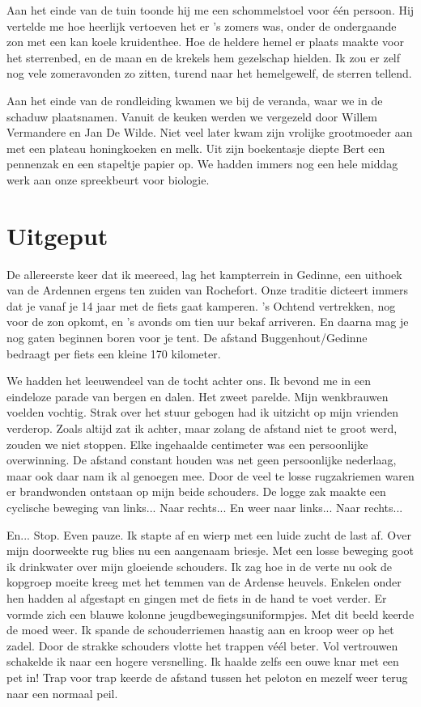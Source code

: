 \documentclass[12pt, justified, a4paper, symmetric]{tufte-book}
\begin{document}
Aan het einde van de tuin toonde hij me een schommelstoel voor \'e\'en persoon. Hij vertelde me hoe heerlijk vertoeven het er 's zomers was, onder de ondergaande zon met een kan koele kruidenthee. Hoe de heldere hemel er plaats maakte voor het sterrenbed, en de maan en de krekels hem gezelschap hielden. Ik zou er zelf nog vele zomeravonden zo zitten, turend naar het hemelgewelf, de sterren tellend.

Aan het einde van de rondleiding kwamen we bij de veranda, waar we in de schaduw plaatsnamen. Vanuit de keuken werden we vergezeld door Willem Vermandere en Jan De Wilde. Niet veel later kwam zijn vrolijke grootmoeder aan met een plateau honingkoeken en melk. Uit zijn boekentasje diepte Bert een pennenzak en een stapeltje papier op. We hadden immers nog een hele middag werk aan onze spreekbeurt voor biologie.

\newpage
\section{Uitgeput}
De allereerste keer dat ik meereed, lag het kampterrein in Gedinne, een uithoek van de Ardennen ergens ten zuiden van Rochefort. Onze traditie dicteert immers dat je vanaf je 14 jaar met de fiets gaat kamperen. 's Ochtend vertrekken, nog voor de zon opkomt, en 's avonds om tien uur bekaf arriveren. En daarna mag je nog gaten beginnen boren voor je tent. De afstand Buggenhout/Gedinne bedraagt per fiets een kleine 170 kilometer.

We hadden het leeuwendeel van de tocht achter ons. Ik bevond me in een eindeloze parade van bergen en dalen. Het zweet parelde. Mijn wenkbrauwen voelden vochtig. Strak over het stuur gebogen had ik uitzicht op mijn vrienden verderop. Zoals altijd zat ik achter, maar zolang de afstand niet te groot werd, zouden we niet stoppen. Elke ingehaalde centimeter was een persoonlijke overwinning. De afstand constant houden was net geen persoonlijke nederlaag, maar ook daar nam ik al genoegen mee. Door de veel te losse rugzakriemen waren er brandwonden ontstaan op mijn beide schouders. De logge zak maakte een cyclische beweging van links... Naar rechts... En weer naar links... Naar rechts...

En... Stop. Even pauze. Ik stapte af en wierp met een luide zucht de last af. Over mijn doorweekte rug blies nu een aangenaam briesje. Met een losse beweging goot ik drinkwater over mijn gloeiende schouders. Ik zag hoe in de verte nu ook de kopgroep moeite kreeg met het temmen van de Ardense heuvels. Enkelen onder hen hadden al afgestapt en gingen met de fiets in de hand te voet verder. Er vormde zich een blauwe kolonne jeugdbewegingsuniformpjes. Met dit beeld keerde de moed weer. Ik spande de schouderriemen haastig aan en kroop weer op het zadel. Door de strakke schouders vlotte het trappen v\'e\'el beter. Vol vertrouwen schakelde ik naar een hogere versnelling. Ik haalde zelfs een ouwe knar met een pet in! Trap voor trap keerde de afstand tussen het peloton en mezelf weer terug naar een normaal peil.
\end{document}
